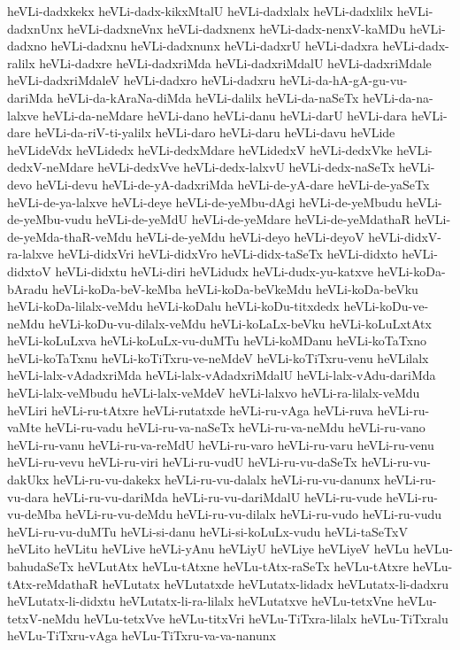 {heVLi-dadxkekx
heVLi-dadx-kikxMtalU
heVLi-dadxlalx
heVLi-dadxlilx
heVLi-dadxnUnx
heVLi-dadxneVnx
heVLi-dadxnenx
heVLi-dadx-nenxV-kaMDu
heVLi-dadxno
heVLi-dadxnu
heVLi-dadxnunx
heVLi-dadxrU
heVLi-dadxra
heVLi-dadx-ralilx
heVLi-dadxre
heVLi-dadxriMda
heVLi-dadxriMdalU
heVLi-dadxriMdale
heVLi-dadxriMdaleV
heVLi-dadxro
heVLi-dadxru
heVLi-da-hA-gA-gu-vu-dariMda
heVLi-da-kAraNa-diMda
heVLi-dalilx
heVLi-da-naSeTx
heVLi-da-na-lalxve
heVLi-da-neMdare
heVLi-dano
heVLi-danu
heVLi-darU
heVLi-dara
heVLi-dare
heVLi-da-riV-ti-yalilx
heVLi-daro
heVLi-daru
heVLi-davu
heVLide
heVLideVdx
heVLidedx
heVLi-dedxMdare
heVLidedxV
heVLi-dedxVke
heVLi-dedxV-neMdare
heVLi-dedxVve
heVLi-dedx-lalxvU
heVLi-dedx-naSeTx
heVLi-devo
heVLi-devu
heVLi-de-yA-dadxriMda
heVLi-de-yA-dare
heVLi-de-yaSeTx
heVLi-de-ya-lalxve
heVLi-deye
heVLi-de-yeMbu-dAgi
heVLi-de-yeMbudu
heVLi-de-yeMbu-vudu
heVLi-de-yeMdU
heVLi-de-yeMdare
heVLi-de-yeMdathaR
heVLi-de-yeMda-thaR-veMdu
heVLi-de-yeMdu
heVLi-deyo
heVLi-deyoV
heVLi-didxV-ra-lalxve
heVLi-didxVri
heVLi-didxVro
heVLi-didx-taSeTx
heVLi-didxto
heVLi-didxtoV
heVLi-didxtu
heVLi-diri
heVLidudx
heVLi-dudx-yu-katxve
heVLi-koDa-bAradu
heVLi-koDa-beV-keMba
heVLi-koDa-beVkeMdu
heVLi-koDa-beVku
heVLi-koDa-lilalx-veMdu
heVLi-koDalu
heVLi-koDu-titxdedx
heVLi-koDu-ve-neMdu
heVLi-koDu-vu-dilalx-veMdu
heVLi-koLaLx-beVku
heVLi-koLuLxtAtx
heVLi-koLuLxva
heVLi-koLuLx-vu-duMTu
heVLi-koMDanu
heVLi-koTaTxno
heVLi-koTaTxnu
heVLi-koTiTxru-ve-neMdeV
heVLi-koTiTxru-venu
heVLilalx
heVLi-lalx-vAdadxriMda
heVLi-lalx-vAdadxriMdalU
heVLi-lalx-vAdu-dariMda
heVLi-lalx-veMbudu
heVLi-lalx-veMdeV
heVLi-lalxvo
heVLi-ra-lilalx-veMdu
heVLiri
heVLi-ru-tAtxre
heVLi-rutatxde
heVLi-ru-vAga
heVLi-ruva
heVLi-ru-vaMte
heVLi-ru-vadu
heVLi-ru-va-naSeTx
heVLi-ru-va-neMdu
heVLi-ru-vano
heVLi-ru-vanu
heVLi-ru-va-reMdU
heVLi-ru-varo
heVLi-ru-varu
heVLi-ru-venu
heVLi-ru-vevu
heVLi-ru-viri
heVLi-ru-vudU
heVLi-ru-vu-daSeTx
heVLi-ru-vu-dakUkx
heVLi-ru-vu-dakekx
heVLi-ru-vu-dalalx
heVLi-ru-vu-danunx
heVLi-ru-vu-dara
heVLi-ru-vu-dariMda
heVLi-ru-vu-dariMdalU
heVLi-ru-vude
heVLi-ru-vu-deMba
heVLi-ru-vu-deMdu
heVLi-ru-vu-dilalx
heVLi-ru-vudo
heVLi-ru-vudu
heVLi-ru-vu-duMTu
heVLi-si-danu
heVLi-si-koLuLx-vudu
heVLi-taSeTxV
heVLito
heVLitu
heVLive
heVLi-yAnu
heVLiyU
heVLiye
heVLiyeV
heVLu
heVLu-bahudaSeTx
heVLutAtx
heVLu-tAtxne
heVLu-tAtx-raSeTx
heVLu-tAtxre
heVLu-tAtx-reMdathaR
heVLutatx
heVLutatxde
heVLutatx-lidadx
heVLutatx-li-dadxru
heVLutatx-li-didxtu
heVLutatx-li-ra-lilalx
heVLutatxve
heVLu-tetxVne
heVLu-tetxV-neMdu
heVLu-tetxVve
heVLu-titxVri
heVLu-TiTxra-lilalx
heVLu-TiTxralu
heVLu-TiTxru-vAga
heVLu-TiTxru-va-va-nanunx
}
